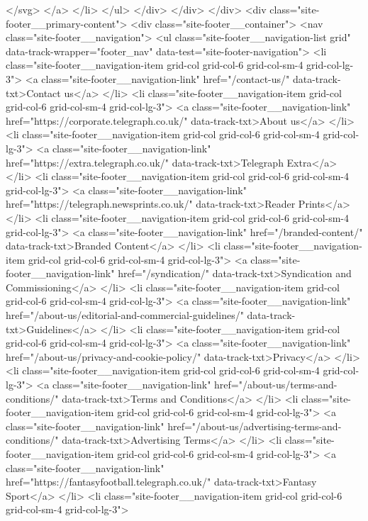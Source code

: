 {{{</svg>
</a>
</li>
</ul>
</div>
</div>
</div>
<div class="site-footer__primary-content">
<div class="site-footer__container">
<nav class="site-footer__navigation">
<ul class="site-footer__navigation-list grid" data-track-wrapper="footer_nav" data-test="site-footer-navigation">
<li class="site-footer__navigation-item grid-col grid-col-6 grid-col-sm-4 grid-col-lg-3">
<a class="site-footer__navigation-link" href="/contact-us/" data-track-txt>Contact us</a>
</li>
<li class="site-footer__navigation-item grid-col grid-col-6 grid-col-sm-4 grid-col-lg-3">
<a class="site-footer__navigation-link" href="https://corporate.telegraph.co.uk/" data-track-txt>About us</a>
</li>
<li class="site-footer__navigation-item grid-col grid-col-6 grid-col-sm-4 grid-col-lg-3">
<a class="site-footer__navigation-link" href="https://extra.telegraph.co.uk/" data-track-txt>Telegraph Extra</a>
</li>
<li class="site-footer__navigation-item grid-col grid-col-6 grid-col-sm-4 grid-col-lg-3">
<a class="site-footer__navigation-link" href="https://telegraph.newsprints.co.uk/" data-track-txt>Reader Prints</a>
</li>
<li class="site-footer__navigation-item grid-col grid-col-6 grid-col-sm-4 grid-col-lg-3">
<a class="site-footer__navigation-link" href="/branded-content/" data-track-txt>Branded Content</a>
</li>
<li class="site-footer__navigation-item grid-col grid-col-6 grid-col-sm-4 grid-col-lg-3">
<a class="site-footer__navigation-link" href="/syndication/" data-track-txt>Syndication and Commissioning</a>
</li>
<li class="site-footer__navigation-item grid-col grid-col-6 grid-col-sm-4 grid-col-lg-3">
<a class="site-footer__navigation-link" href="/about-us/editorial-and-commercial-guidelines/" data-track-txt>Guidelines</a>
</li>
<li class="site-footer__navigation-item grid-col grid-col-6 grid-col-sm-4 grid-col-lg-3">
<a class="site-footer__navigation-link" href="/about-us/privacy-and-cookie-policy/" data-track-txt>Privacy</a>
</li>
<li class="site-footer__navigation-item grid-col grid-col-6 grid-col-sm-4 grid-col-lg-3">
<a class="site-footer__navigation-link" href="/about-us/terms-and-conditions/" data-track-txt>Terms and Conditions</a>
</li>
<li class="site-footer__navigation-item grid-col grid-col-6 grid-col-sm-4 grid-col-lg-3">
<a class="site-footer__navigation-link" href="/about-us/advertising-terms-and-conditions/" data-track-txt>Advertising Terms</a>
</li>
<li class="site-footer__navigation-item grid-col grid-col-6 grid-col-sm-4 grid-col-lg-3">
<a class="site-footer__navigation-link" href="https://fantasyfootball.telegraph.co.uk/" data-track-txt>Fantasy Sport</a>
</li>
<li class="site-footer__navigation-item grid-col grid-col-6 grid-col-sm-4 grid-col-lg-3">
}}}
